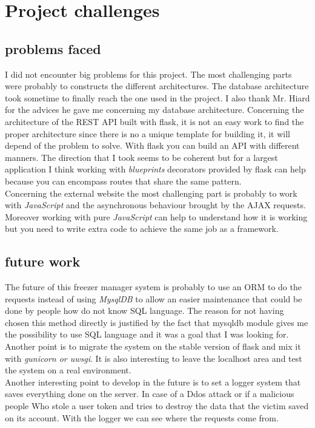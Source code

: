 \section{Project challenges}
\subsection{problems faced}
I did not encounter big problems for this project. The most challenging parts were probably to constructs the different architectures. The database architecture took sometime to finally reach the one used in the project. I also thank Mr. Hiard for the advices he gave me concerning my database architecture. Concerning the architecture of the REST API built with flask, it is not an easy work to find the proper architecture since there is no a unique template for building it, it will depend of the problem to solve. With flask you can build an API with different manners. The direction that I took seems to be coherent but for a largest application I think working with \textit{blueprints} decorators provided by flask can help because you can encompass routes that share the same pattern.\\

Concerning the external website the most challenging part is probably to work with \textit{JavaScript} and the asynchronous behaviour brought by the AJAX requests. Moreover working with pure \textit{JavaScript} can help to understand how it is working but you need to write extra code to achieve the same job as a framework.
\subsection{future work}
The future of this freezer manager system is probably to use an ORM to do the requests instead of using \textit{MysqlDB} to allow an easier maintenance that could be done by people how do not know SQL language. The reason for not having chosen this method directly is justified by the fact that mysqldb module gives me the possibility to use SQL language and it was a goal that I was looking for.\\

Another point is to migrate the system on the stable version of flask and mix it with \textit{gunicorn or uwsgi}. It is also interesting to leave the localhost area and test the system on a real environment.\\

Another interesting point to develop in the future is to set a logger system that saves everything done on the server. In case of a Ddos attack or if a malicious people Who stole a user token and tries to destroy the data that the victim saved on its account. With the logger we can see where the requests come from.\\

